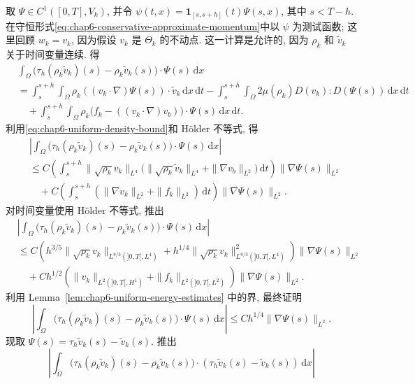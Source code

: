 \begin{sloppypar}
\begin{Proof}
\begin{itemize}
 取 $\Psi\in C^1([0,T],V_k)$, 并令
 $\psi(t,x)=\mathbf1_{[s,s+h]}(t)\Psi(s,x)$, 其中 $s<T-h$. 在守恒形式\eqref{eq:chap6-conservative-approximate-momentum}中以 $\psi$ 为测试函数; 这里回顾 $w_k=v_k$, 因为假设 $v_k$ 是 $\Theta_k$ 的不动点. 这一计算是允许的, 因为 $\rho_k$ 和 $\widetilde v_k$ 关于时间变量连续. 得
 \[
 \begin{aligned}
 &\int_\Omega\bigl(\tau_h(\rho_k\widetilde v_k)(s)-\rho_k\widetilde v_k(s)\bigr)
 \cdot\Psi(s)\,\mathrm dx\\
 &=\int_s^{s+h}\int_\Omega\rho_k((v_k\cdot\nabla)\Psi(s))\cdot\widetilde v_k
 \,\mathrm dx\,\mathrm dt
 -\int_s^{s+h}\int_\Omega2\mu(\rho_k)D(v_k):D(\Psi(s))\,\mathrm dx\,\mathrm dt\\
 &\quad+\int_s^{s+h}\int_\Omega\rho_k\bigl(f_k-((v_k\cdot\nabla)v_b)\bigr)
 \cdot\Psi(s)\,\mathrm dx\,\mathrm dt.
 \end{aligned}
 \]
 利用\eqref{eq:chap6-uniform-density-bound}和 H\"older 不等式, 得
 \[
 \begin{aligned}
 &\left|\int_\Omega\bigl(\tau_h(\rho_k\widetilde v_k)(s)-\rho_k\widetilde v_k(s)\bigr)
 \cdot\Psi(s)\,\mathrm dx\right|\\
 &\leq C\left(\int_s^{s+h}\|\sqrt{\rho_k}v_k\|_{L^4}
 \bigl(\|\sqrt{\rho_k}\widetilde v_k\|_{L^4}+\|\nabla v_b\|_{L^2}\bigr)
 \,\mathrm dt\right)\|\nabla\Psi(s)\|_{L^2}\\
 &\quad+C\left(\int_s^{s+h}
 (\|\nabla v_k\|_{L^2}+\|f_k\|_{L^2})\,\mathrm dt\right)
 \|\nabla\Psi(s)\|_{L^2}.
 \end{aligned}
 \]
 对时间变量使用 H\"older 不等式, 推出
 \[
 \begin{aligned}
 &\left|\int_\Omega\bigl(\tau_h(\rho_k\widetilde v_k)(s)-\rho_k\widetilde v_k(s)\bigr)
 \cdot\Psi(s)\,\mathrm dx\right|\\
 &\leq C\left(h^{3/5}\|\sqrt{\rho_k}v_k\|_{L^{8/3}(]0,T[,L^4)}
 +h^{1/4}\|\sqrt{\rho_k}v_k\|_{L^{8/3}(]0,T[,L^4)}^2\right)
 \|\nabla\Psi(s)\|_{L^2}\\
 &\quad+Ch^{1/2}\left(\|v_k\|_{L^2(]0,T[,H^1)}
 +\|f_k\|_{L^2(]0,T[,L^2)}\right)\|\nabla\Psi(s)\|_{L^2}.
 \end{aligned}
 \]
 利用 Lemma~\ref{lem:chap6-uniform-energy-estimates} 中的界, 最终证明
 \[
 \left|\int_\Omega\bigl(\tau_h(\rho_k\widetilde v_k)(s)-\rho_k\widetilde v_k(s)\bigr)
 \cdot\Psi(s)\,\mathrm dx\right|
 \leq Ch^{1/4}\|\nabla\Psi(s)\|_{L^2}.
 \]
 现取 $\Psi(s)=\tau_h\widetilde v_k(s)-\widetilde v_k(s)$. 推出
 \[
 \left|\int_\Omega\bigl(\tau_h(\rho_k\widetilde v_k)(s)-\rho_k\widetilde v_k(s)\bigr)
 \cdot(\tau_h\widetilde v_k(s)-\widetilde v_k(s))\,\mathrm dx\right|
\]
\end{itemize}
\end{Proof}
\end{sloppypar}
